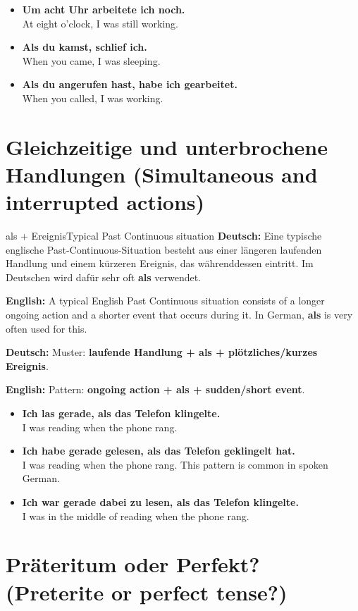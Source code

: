 \documentclass[a4paper,11pt]{article}
\newcommand{\GermanText}[1]{\textbf{Deutsch: }#1\par}
\newcommand{\EnglishText}[1]{{\small\color{SoftGray}\textbf{English: }#1\par}}
\newcommand{\ExampleItem}[2]{\item \textbf{#1}\\{\small\color{SoftGray}#2}}
\begin{document}
        \begin{exbox}
            \begin{itemize}
                \ExampleItem{Um acht Uhr arbeitete ich noch.}{At eight o'clock, I was still working.}
                \ExampleItem{Als du kamst, schlief ich.}{When you came, I was sleeping.}
                \ExampleItem{Als du angerufen hast, habe ich gearbeitet.}{When you called, I was working.}
            \end{itemize}
        \end{exbox}

    \section{Gleichzeitige und unterbrochene Handlungen \textnormal{(Simultaneous and interrupted actions)}}

        \begin{grammarentry}{als + Ereignis}{Typical Past Continuous situation}
            \GermanText{Eine typische englische Past-Continuous-Situation besteht aus einer längeren laufenden Handlung und einem kürzeren Ereignis, das währenddessen eintritt. Im Deutschen wird dafür sehr oft \textbf{als} verwendet.}
            \EnglishText{A typical English Past Continuous situation consists of a longer ongoing action and a shorter event that occurs during it. In German, \textbf{als} is very often used for this.}

            \GermanText{Muster: \textbf{laufende Handlung + als + plötzliches/kurzes Ereignis}.}
            \EnglishText{Pattern: \textbf{ongoing action + als + sudden/short event}.}
        \end{grammarentry}

        \begin{exbox}
            \begin{itemize}
                \ExampleItem{Ich las gerade, als das Telefon klingelte.}{I was reading when the phone rang.}
                \ExampleItem{Ich habe gerade gelesen, als das Telefon geklingelt hat.}{I was reading when the phone rang. This pattern is common in spoken German.}
                \ExampleItem{Ich war gerade dabei zu lesen, als das Telefon klingelte.}{I was in the middle of reading when the phone rang.}
            \end{itemize}
        \end{exbox}

    \section{Präteritum oder Perfekt? \textnormal{(Preterite or perfect tense?)}}
\end{document}
